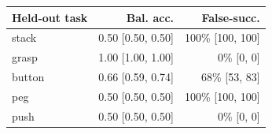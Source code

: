 \begin{tabular}{lrr}
\toprule
Held-out task & Bal. acc. & False-succ. \\
\midrule
stack & 0.50 [0.50, 0.50] & 100\% [100, 100] \\
grasp & 1.00 [1.00, 1.00] & 0\% [0, 0] \\
button & 0.66 [0.59, 0.74] & 68\% [53, 83] \\
peg & 0.50 [0.50, 0.50] & 100\% [100, 100] \\
push & 0.50 [0.50, 0.50] & 0\% [0, 0] \\
\bottomrule
\end{tabular}